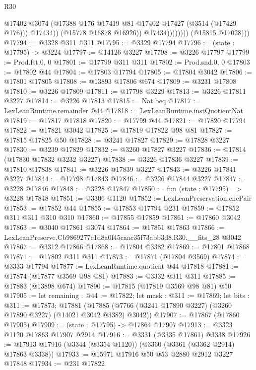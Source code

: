 \begin{lexlean}{R30}
\begin{coremodule}
                              @17402
                              @3074
                              (@17388 @176 @17419 @81 @17402 @17427 (@3514 (@17429 @176)))
                              @17434))
                          (@15778 @16878 @16926))
                        @17434))))))))
        (@15815 @17028)))
@17794 := @3328 @311 @311
@17795 := @3329 @17794
@17796 := (state : @17795) -> @3224
@17797 := @14126 @3227
@17798 := @3226 @17797
@17799 := Prod.fst.{0, 0}
@17801 := @17799 @311 @311
@17802 := Prod.snd.{0, 0}
@17803 := @17802 @44
@17804 := @17803 @17794
@17805 := @17804 @3042
@17806 := @17801 @17805
@17808 := @13893 @17806 @674
@17809 := @3231 @17808
@17810 := @3226 @17809
@17811 := @17798 @3229
@17813 := @3226 @17811 @3227
@17814 := @3226 @17813
@17815 := Nat.beq
@17817 := LexLeanRuntime.remainder @44
@17818 := LexLeanRuntime.instQuotientNat
@17819 := @17817 @17818
@17820 := @17799 @44
@17821 := @17820 @17794
@17822 := @17821 @3042
@17825 := @17819 @17822 @98 @81
@17827 := @17815 @17825 @50
@17828 := @3241 @17827
@17829 := @17828 @3227
@17830 := @3239 @17829
@17832 := @3260 @17827 @3227
@17836 := @17814 (@17830 @17832 @3232 @3227)
@17838 := @3226 @17836 @3227
@17839 := @17810 @17838
@17841 := @3226 @17839 @3227
@17843 := @3226 @17841 @3227
@17844 := @17798 @17843
@17846 := @3226 @17844 @3227
@17847 := @3228 @17846
@17848 := @3228 @17847
@17850 := fun (state : @17795) => @3228 @17848
@17851 := @3306 @1120
@17852 := LexLeanPreservation.encPair
@17853 := @17852 @44
@17855 := @17853 @17794 @231
@17859 := @17852 @311 @311 @310 @310
@17860 := @17855 @17859
@17861 := @17860 @3042
@17863 := @3040 @17861 @3074
@17864 := @17851 @17863
@17866 := LexLeanPreserve.Cb9869277c1d8a0f45caac35f73abb3d8.R30.__fits_28 @3042
@17867 := @3312 @17866
@17868 := @17804 @3382
@17869 := @17801 @17868
@17871 := @17802 @311 @311
@17873 := @17871 (@17804 @3569)
@17874 := @3333 @17794
@17877 := LexLeanRuntime.quotient @44 @17818
@17881 := @17874 (@17877 @3569 @98 @81)
@17883 := @3332 @311 @311
@17885 := @17883 (@13898 @674)
@17890 := @17815 (@17819 @3569 @98 @81) @50
@17905 := let remaining : @44 := @17822;
  let mask : @311 := @17869;
  let bits : @311 := @17873;
  @17881 (@17885 (@7766 (@3241 @17890 @3227) (@3260 @17890 @3227) (@14021 @3042 @3382) @3042))
@17907 := @17867 (@17860 @17905)
@17909 := (state : @17795) -> @17864 @17907
@17913 := @3323 @1120 @17863 @17907 @2914
@17916 := @3331 (@3335 @17861) @3338
@17926 := @17913 @17916 (@3344 (@3354 @1120)) (@3360 (@3361 (@3362 @2914) @17863 @3338))
@17933 := @15971 @17916 @50 @53 @2880 @2912 @3227 @17848
@17934 := @231 @17822

\end{coremodule}
\end{lexlean}
